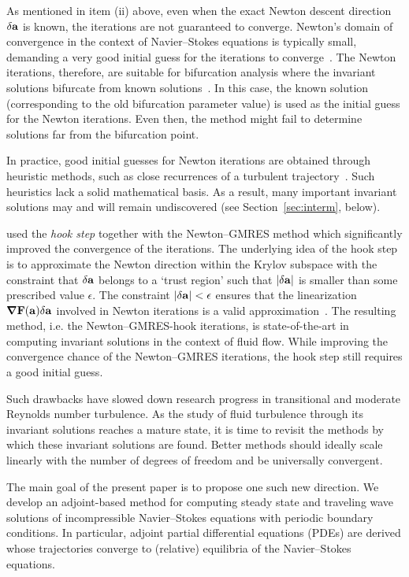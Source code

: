 \documentclass{article}
\begin{document}
As mentioned in item (ii) above, even when the exact Newton descent direction $\delta \mathbf a$
is known, the iterations are not guaranteed to converge. Newton's domain of convergence
in the context of Navier--Stokes equations is typically small,
demanding a very good initial guess for the iterations to converge~\citep{W97}. The Newton
iterations, therefore, are suitable
for bifurcation analysis where the invariant solutions bifurcate from known
solutions~\citep{Tuck00,W03,K12}. In this case, the known solution (corresponding to the
old bifurcation parameter value) is used as the initial guess for the Newton iterations.
Even then, the method might fail to determine solutions far from the bifurcation point.

In practice, good initial guesses for Newton iterations are obtained through heuristic methods,
such as close recurrences of a turbulent trajectory~\citep{pchaot,kawahara06,DV04,CviGib10}.
Such heuristics lack a
solid
mathematical
basis. As a result, many important invariant solutions may and will remain undiscovered
(see Section~\ref{sec:interm}, below).

\cite{DV04} used the \emph{hook step}
together with the Newton--GMRES
method which significantly improved the convergence of the iterations. The
underlying idea of the hook step is to
approximate the Newton direction within the Krylov subspace with the constraint that
$\delta \mathbf a$ belongs to a `trust region' such that
$|\delta \mathbf a|$ is smaller than some prescribed value $\epsilon$. The
constraint $|\delta\mathbf a|<\epsilon$ ensures that the linearization
$\mbox{\boldmath $\nabla$}\mathbf F(\mathbf a)\delta\mathbf a$ involved in Newton iterations is a valid approximation~\citep{DS}.
The resulting method, i.e. the Newton--GMRES-hook iterations, is state-of-the-art
in computing invariant solutions in the context of fluid flow.
While improving the convergence chance of
the Newton--GMRES iterations, the hook step still requires a good
initial guess.

Such drawbacks have slowed down research progress in transitional and moderate Reynolds
number turbulence.
As the study of fluid turbulence through its invariant solutions reaches a mature state, it is time
to revisit the methods by which these invariant solutions are found. Better
methods should ideally scale linearly with the number of degrees of freedom and be
universally convergent.

The main goal of the present paper is to propose one such new direction.
We develop an adjoint-based method for computing steady state and
traveling wave solutions of incompressible Navier--Stokes equations with periodic
boundary conditions. In particular, adjoint partial differential equations (PDEs) are derived whose 
trajectories converge to
(relative) equilibria of the Navier--Stokes equations.
\end{document}
